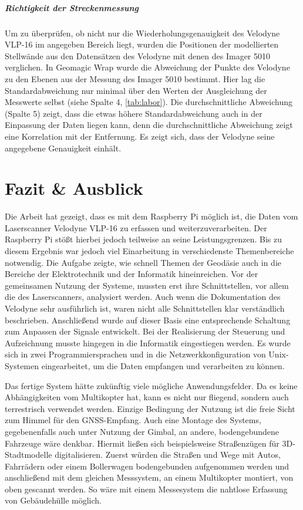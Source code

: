 \documentclass[a4paper,12pt,bibliography=totoc, listof=totoc,titlepage,pointlessnumbers]{scrreprt}
\begin{document}
\paragraph{Richtigkeit der Streckenmessung}
Um zu überprüfen, ob nicht nur die Wiederholungsgenauigkeit des Velodyne VLP-16 im angegeben Bereich liegt, wurden die Positionen der modellierten Stellwände aus den Datensätzen des Velodyne mit denen des Imager 5010 verglichen. In Geomagic Wrap wurde die Abweichung der Punkte des Velodyne zu den Ebenen aus der Messung des Imager 5010 bestimmt. Hier lag die Standardabweichung nur minimal über den Werten der Ausgleichung der Messwerte selbst (siehe Spalte 4, \autoref{tab:labor}). Die durchschnittliche Abweichung (Spalte 5) zeigt, dass die etwas höhere Standardabweichung auch in der Einpassung der Daten liegen kann, denn die durchschnittliche Abweichung zeigt eine Korrelation mit der Entfernung. Es zeigt sich, dass der Velodyne seine angegebene Genauigkeit einhält.

\chapter{Fazit \& Ausblick}
\label{c:ausblick}

Die Arbeit hat gezeigt, dass es mit dem Rasp\-berry Pi möglich ist, die Daten vom Laserscanner Velodyne VLP-16 zu erfassen und weiterzuverarbeiten. Der Rasp\-berry Pi stößt hierbei jedoch teilweise an seine Leistungsgrenzen. Bis zu diesem Ergebnis war jedoch viel Einarbeitung in verschiedenste Themenbereiche notwendig. Die Aufgabe zeigte, wie schnell Themen der Geodäsie auch in die Bereiche der Elektrotechnik und der Informatik hineinreichen. Vor der gemeinsamen Nutzung der Systeme, mussten erst ihre Schnittstellen, vor allem die des Laserscanners, analysiert werden. Auch wenn die Dokumentation des Velodyne sehr ausführlich ist, waren nicht alle Schnittstellen klar verständlich beschrieben. Anschließend wurde auf dieser Basis eine entsprechende Schaltung zum Anpassen der Signale entwickelt. Bei der Realisierung der Steuerung und Aufzeichnung musste hingegen in die Informatik eingestiegen werden. Es wurde sich in zwei Programmiersprachen und in die Netzwerkkonfiguration von Unix-Systemen eingearbeitet, um die Daten empfangen und verarbeiten zu können.

Das fertige System hätte zukünftig viele mögliche Anwendungsfelder. Da es keine Abhängigkeiten vom Multikopter hat, kann es nicht nur fliegend, sondern auch terrestrisch verwendet werden. Einzige Bedingung der Nutzung ist die freie Sicht zum Himmel für den GNSS-Empfang. Auch eine Montage des Systems, gegebenenfalls auch unter Nutzung der Gimbal, an andere, bodengebundene Fahrzeuge wäre denkbar. Hiermit ließen sich beispielsweise Straßenzügen für 3D-Stadtmodelle digitalisieren. Zuerst würden die Straßen und Wege mit Autos, Fahrrädern oder einem Bollerwagen bodengebunden aufgenommen werden und anschließend mit dem gleichen Messsystem, an einem Multikopter montiert, von oben gescannt werden. So wäre mit einem Messesystem die nahtlose Erfassung von Gebäudehülle möglich.
\end{document}
